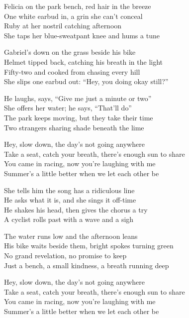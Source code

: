 \begin{lyrics}
Felicia on the park bench, red hair in the breeze\\
One white earbud in, a grin she can't conceal\\
Ruby at her nostril catching afternoon\\
She taps her blue-sweatpant knee and hums a tune

Gabriel's down on the grass beside his bike\\
Helmet tipped back, catching his breath in the light\\
Fifty-two and cooked from chasing every hill\\
She slips one earbud out: “Hey, you doing okay still?”

He laughs, says, “Give me just a minute or two”\\
She offers her water; he says, “That'll do”\\
The park keeps moving, but they take their time\\
Two strangers sharing shade beneath the lime

Hey, slow down, the day's not going anywhere\\
Take a seat, catch your breath, there's enough sun to share\\
You came in racing, now you're laughing with me\\
Summer's a little better when we let each other be

She tells him the song has a ridiculous line\\
He asks what it is, and she sings it off-time\\
He shakes his head, then gives the chorus a try\\
A cyclist rolls past with a wave and a sigh

The water runs low and the afternoon leans\\
His bike waits beside them, bright spokes turning green\\
No grand revelation, no promise to keep\\
Just a bench, a small kindness, a breath running deep

Hey, slow down, the day's not going anywhere\\
Take a seat, catch your breath, there's enough sun to share\\
You came in racing, now you're laughing with me\\
Summer's a little better when we let each other be


\end{lyrics}
